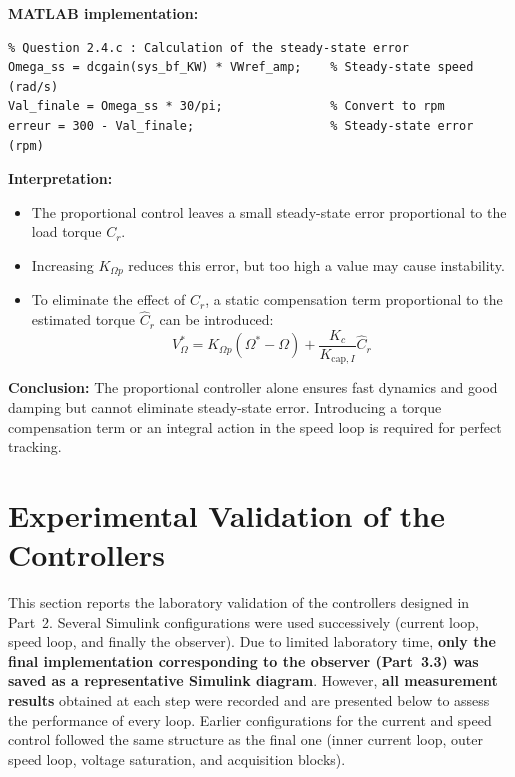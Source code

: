 \documentclass{rapportCS}
\begin{document}
\noindent\textbf{MATLAB implementation:}
\begin{verbatim}
% Question 2.4.c : Calculation of the steady-state error
Omega_ss = dcgain(sys_bf_KW) * VWref_amp;    % Steady-state speed (rad/s)
Val_finale = Omega_ss * 30/pi;               % Convert to rpm
erreur = 300 - Val_finale;                   % Steady-state error (rpm)
\end{verbatim}

\noindent\textbf{Interpretation:}
\begin{itemize}
    \item The proportional control leaves a small steady-state error proportional to the load torque $C_r$.
    \item Increasing $K_{\Omega p}$ reduces this error, but too high a value may cause instability.
    \item To eliminate the effect of $C_r$, a static compensation term proportional to the estimated torque $\hat{C}_r$ can be introduced:
    \[
    V_{\Omega}^* = K_{\Omega p}(\Omega^* - \Omega) + \frac{K_c}{K_{\mathrm{cap},I}} \hat{C}_r
    \]
\end{itemize}

\noindent\textbf{Conclusion:}
The proportional controller alone ensures fast dynamics and good damping but cannot eliminate steady-state error.  
Introducing a torque compensation term or an integral action in the speed loop is required for perfect tracking.

\newpage

\section{Experimental Validation of the Controllers}

\label{sec:exp}

This section reports the laboratory validation of the controllers designed in Part~2. 
Several Simulink configurations were used successively (current loop, speed loop, and finally the observer). 
Due to limited laboratory time, \textbf{only the final implementation corresponding to the observer (Part~3.3) was saved as a representative Simulink diagram}. 
However, \textbf{all measurement results} obtained at each step were recorded and are presented below to assess the performance of every loop. 
Earlier configurations for the current and speed control followed the same structure as the final one (inner current loop, outer speed loop, voltage saturation, and acquisition blocks).
\end{document}

